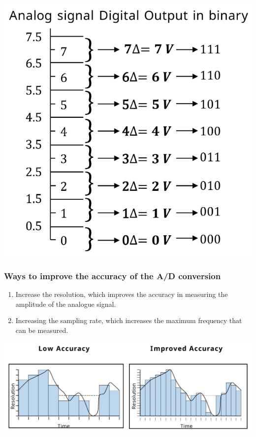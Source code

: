 \documentclass[11pt]{article}
\begin{document}
\begin{center}
\includegraphics[width=.9\linewidth]{./images/analogue-signal-after-quantisation-and-encoding.png}
\end{center}

 \newpage
\subsubsection{Ways to improve the accuracy of the A/D conversion}
\label{sec:orga08264e}
\begin{enumerate}
\item Increase the resolution, which improves the accuracy in measuring the amplitude of the analogue signal.
\item Increasing the sampling rate, which increases the maximum frequency that can be measured.
\end{enumerate}

\begin{center}
\includegraphics[width=.9\linewidth]{./images/accuracy-comparison-of-a-d-conversion-after-improvements.png}
\end{center}
\end{document}
